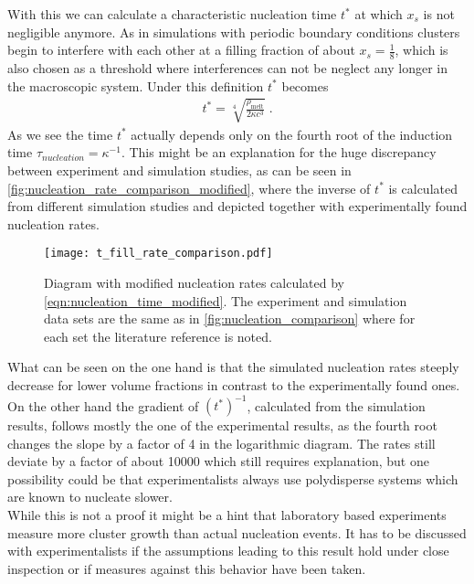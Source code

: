 With this we can calculate a characteristic nucleation time $t^*$ at which $x_s$ is not negligible anymore. As in simulations with periodic boundary conditions clusters begin to interfere with each other at a filling fraction of about $x_s=\frac{1}{8}$, which is also chosen as a threshold where interferences can not be neglect any longer in the macroscopic system. Under this definition $t^*$ becomes
\begin{align}
\label{eqn:nucleation_time_modified}
t^* = \sqrt[4]{\frac{\rho_{\text{melt}}}{2 \kappa c^3 }} \; \text{.}
\end{align}
As we see the time $t^*$ actually depends only on the fourth root of the induction time $\tau_{nucleation} = \kappa^{-1}$. This might be an explanation for the huge discrepancy between experiment and simulation studies, as can be seen in \autoref{fig:nucleation_rate_comparison_modified}, where the inverse of $t^*$ is calculated from different simulation studies and depicted together with experimentally found nucleation rates.\\
\begin{figure}[h]
\centering
\texttt{[image: t\_fill\_rate\_comparison.pdf]}
\caption[Nucleation rate comparison under assumption of early filled boxes]{Diagram with modified nucleation rates calculated by \autoref{eqn:nucleation_time_modified}. The experiment and simulation data sets are the same as in \autoref{fig:nucleation_comparison} where for each set the literature reference is noted.}
\label{fig:nucleation_rate_comparison_modified}
\end{figure}

What can be seen on the one hand is that the simulated nucleation rates steeply decrease for lower volume fractions in contrast to the experimentally found ones. On the other hand the gradient of $(t^*)^{-1}$, calculated from the simulation results, follows mostly the one of the experimental results, as the fourth root changes the slope by a factor of 4 in the logarithmic diagram. The rates still deviate by a factor of about 10000 which still requires explanation, but one possibility could be that experimentalists always use polydisperse systems which are known to nucleate slower.\\

While this is not a proof it might be a hint that laboratory based experiments measure more cluster growth than actual nucleation events. It has to be discussed with experimentalists if the assumptions leading to this result hold under close inspection or if measures against this behavior have been taken.
